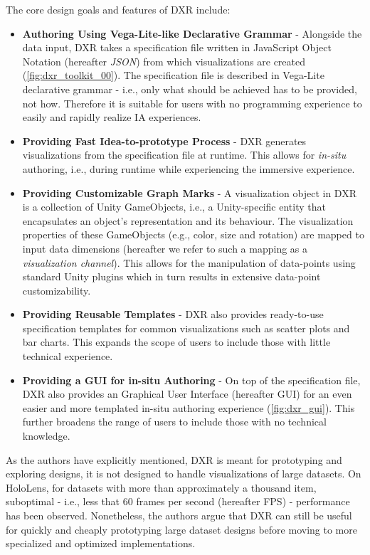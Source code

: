 \documentclass{vgtc}                          %
\begin{document}
\noindent The core design goals and features of DXR include:
\begin{itemize}
    \item \textbf{Authoring Using Vega-Lite-like Declarative Grammar} - Alongside the data input, DXR takes a
    specification file written in JavaScript Object Notation (hereafter \textit{JSON}) from which
    visualizations are created (\autoref{fig:dxr_toolkit_00}). The specification file is described in Vega-Lite declarative grammar \cite{vega_lite} - i.e., only what should be
    achieved has to be provided, not how. Therefore it is suitable for users with no programming experience to
    easily and rapidly realize IA experiences.
    \item \textbf{Providing Fast Idea-to-prototype Process} - DXR generates visualizations from the
    specification file at runtime. This allows for \textit{in-situ} authoring, i.e., during runtime while
    experiencing the immersive experience.
    \item \textbf{Providing Customizable Graph Marks} - A visualization object in DXR is a collection of
    Unity GameObjects, i.e., a Unity-specific entity that encapsulates an object's representation and its
    behaviour. The visualization properties of these GameObjects (e.g., color, size and rotation) are mapped
    to input data dimensions (hereafter we refer to such a mapping as a \textit{visualization channel}).
    This allows for the manipulation of data-points using standard Unity plugins which in turn results in
    extensive data-point customizability.
    \item \textbf{Providing Reusable Templates} - DXR also provides ready-to-use specification templates for
    common visualizations such as scatter plots and bar charts. This expands the scope of users to include
    those with little technical experience.
	\item \textbf{Providing a GUI for in-situ Authoring} - On top of the specification file, DXR also
    provides an Graphical User Interface (hereafter GUI) for an even easier and more templated in-situ
    authoring experience (\autoref{fig:dxr_gui}). This further broadens the range of users to include those with no technical knowledge.
\end{itemize}

\medskip

\noindent As the authors have explicitly mentioned, DXR is meant for prototyping and exploring designs, it is
not designed to handle visualizations of large datasets. On HoloLens, for datasets with more than
approximately a thousand item, suboptimal - i.e., less that 60 frames per second (hereafter FPS) -
performance has been observed. Nonetheless, the authors argue that DXR can still be useful for quickly and
cheaply prototyping large dataset designs before moving to more specialized and optimized implementations.
\end{document}
